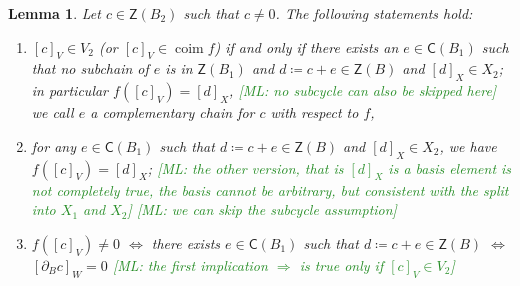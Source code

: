 \documentclass[letterpaper,11pt]{article}
\theoremstyle{plain}
\newtheorem{lemma}[theorem]{Lemma}
\theoremstyle{definition}
\newcommand{\coim}{\operatorname{coim}}
\newcounter{li}
\newcommand{\Zgroup}{\mathsf{Z}}
\newcommand{\Cgroup}{\mathsf{C}}
\newcommand\michal[1]{\textcolor{ForestGreen}{[ML: #1]}}
\begin{document}
{\begin{lemma}\label{lem:the-reversed-homomorphism-apdx}
    Let $c\in\Zgroup(B_2)$ such that $c\neq 0$.
    The following statements hold:
    \begin{enumerate}[label=\arabic*)]
        \item\label{it:the-reversed-homomorphism-chain-exists-apdx}
            $[c]_V\in V_2$ (or $[c]_V\in\coim f$) if and only if there exists an $e\in\Cgroup(B_1)$ such that no subchain of $e$ is in $\Zgroup(B_1)$ and  $d\coloneqq c+e\in\Zgroup(B)$ and $[d]_X\in X_2$; in particular $f([c]_{V})= [d]_X$,
            \michal{no subcycle can also be skipped here}
            we call $e$ a \emph{complementary chain for $c$ with respect to $f$},
        \item\label{it:the-reversed-homomorphism-chain-e-apdx} 
            for any $e\in\Cgroup(B_1)$ such that $d\coloneqq c+e\in\Zgroup(B)$ and $[d]_X\in X_2$, 
            we have $f([c]_{V})= [d]_X$;
            \michal{the other version, that is $[d]_X$ is a basis element is not completely true, the basis cannot be arbitrary, but consistent with the split into $X_1$ and $X_2$}
            \michal{we can skip the subcycle assumption}
        \item\label{it:the-reversed-homomorphism-non-zero-apdx}
            $f([c]_{V})\not = 0$ $\Leftrightarrow$
            there exists $e\in\Cgroup(B_1)$ such that $d\coloneqq c+e\in\Zgroup(B)$
            $\Leftrightarrow$ $[\partial_B c]_W=0$
            \michal{the first implication $\Rightarrow$ is true only if $[c]_V\in V_2$}

\end{enumerate}
\end{lemma}}
\end{document}
